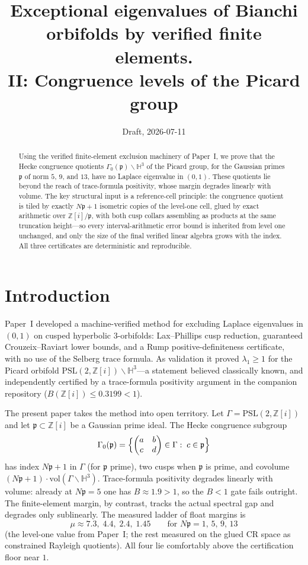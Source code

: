 \documentclass[11pt]{amsart}
\title[Verified exclusion of exceptional eigenvalues, II]{Exceptional
eigenvalues of Bianchi orbifolds by verified finite elements.\\
II: Congruence levels of the Picard group}
\author{}
\date{Draft, 2026-07-11}
\newcommand{\HH}{\mathbb{H}^3}
\newcommand{\ZZ}{\mathbb{Z}}
\newcommand{\PSL}{\mathrm{PSL}}
\newcommand{\p}{\mathfrak{p}}
\newcommand{\vol}{\mathrm{vol}}
\begin{document}
\begin{abstract}
Using the verified finite-element exclusion machinery of Paper~I, we
prove that the Hecke congruence quotients
$\Gamma_0(\p)\backslash\HH$ of the Picard group, for the Gaussian
primes $\p$ of norm $5$, $9$, and $13$, have no Laplace eigenvalue in
$(0,1)$.  These quotients lie beyond the reach of trace-formula
positivity, whose margin degrades linearly with volume.  The key
structural input is a reference-cell principle: the congruence quotient
is tiled by exactly $N\p+1$ isometric copies of the level-one cell,
glued by exact arithmetic over $\ZZ[i]/\p$, with both cusp collars
assembling as products at the same truncation height---so every
interval-arithmetic error bound is inherited from level one unchanged,
and only the size of the final verified linear algebra grows with the
index.  All three certificates are deterministic and reproducible.
\end{abstract}
\maketitle

\section{Introduction}

Paper~I \cite{PaperI} developed a machine-verified method for excluding
Laplace eigenvalues in $(0,1)$ on cusped hyperbolic $3$-orbifolds:
Lax--Phillips cusp reduction, guaranteed Crouzeix--Raviart lower bounds,
and a Rump positive-definiteness certificate, with no use of the Selberg
trace formula.  As validation it proved $\lambda_1\ge 1$ for the Picard
orbifold $\PSL(2,\ZZ[i])\backslash\HH$---a statement believed classically
known, and independently certified by a trace-formula positivity argument
in the companion repository ($B(\ZZ[i])\le 0.3199<1$).

The present paper takes the method into open territory.  Let
$\Gamma=\PSL(2,\ZZ[i])$ and let $\p\subset\ZZ[i]$ be a Gaussian prime
ideal.  The Hecke congruence subgroup
\[
  \Gamma_0(\p)
  =\Bigl\{\begin{pmatrix}a&b\\c&d\end{pmatrix}\in\Gamma:\;c\in\p\Bigr\}
\]
has index $N\p+1$ in $\Gamma$ (for $\p$ prime), two cusps when $\p$ is
prime, and covolume $(N\p+1)\cdot\vol(\Gamma\backslash\HH)$.  Trace-formula
positivity degrades linearly with volume: already at $N\p=5$ one has
$B\approx 1.9>1$, so the $B<1$ gate fails outright.  The finite-element
margin, by contrast, tracks the actual spectral gap and degrades only
sublinearly.  The measured ladder of float margins is
\begin{equation}\label{eq:ladder}
  \mu\approx 7.3,\; 4.4,\; 2.4,\; 1.45
  \qquad\text{for }N\p=1,\,5,\,9,\,13
\end{equation}
(the level-one value from Paper~I; the rest measured on the glued CR
space as constrained Rayleigh quotients).  All four lie comfortably above
the certification floor near $1$.
\end{document}

